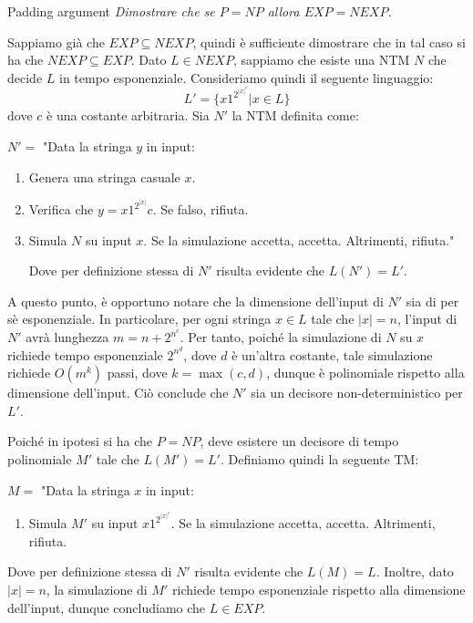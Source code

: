 \begin{Exercise}{Padding argument}{}
\textit{Dimostrare che se $P = NP$ allora $EXP = NEXP$.}

\begin{demonstration}
Sappiamo già che $EXP\subseteq NEXP$, quindi è sufficiente dimostrare che in tal caso si ha che $NEXP\subseteq EXP$. Dato $L\in NEXP$, sappiamo che esiste una NTM $N$ che decide $L$ in tempo esponenziale. Consideriamo quindi il seguente linguaggio:
\begin{equation*}
    L' = \{x1^{2^{|x|^c}}| x\in L\}
\end{equation*}
dove $c$ è una costante arbitraria. Sia $N'$ la NTM definita come:

$N' =$ "Data la stringa $y$ in input:
\begin{enumerate}
    \item Genera una stringa casuale $x$.
    \item Verifica che $y = x1^{2^{|x|}}c$. Se falso, rifiuta.
    \item Simula $N$ su input $x$. Se la simulazione accetta, accetta. Altrimenti, rifiuta."
    
    Dove per definizione stessa di $N'$ risulta evidente che $L(N') = L'$.
\end{enumerate}
A questo punto, è opportuno notare che la dimensione dell’input di $N'$ sia di per sè esponenziale. In particolare, per ogni stringa $x\in L$ tale che $|x| = n$, l’input di $N'$ avrà lunghezza $m = n + 2^{n^c}$. Per tanto, poiché la simulazione di $N$ su $x$ richiede tempo esponenziale $2^{n^d}$, dove $d$ è un’altra costante, tale simulazione richiede $O(m^k)$ passi, dove $k = \max(c, d)$, dunque è polinomiale rispetto alla dimensione dell’input. Ciò conclude che $N'$ sia un decisore non-deterministico per $L'$.

Poiché in ipotesi si ha che $P = NP$, deve esistere un decisore di tempo polinomiale $M'$ tale che $L(M') = L'$. Definiamo quindi la seguente TM:

$M =$ "Data la stringa $x$ in input:
\begin{enumerate}
    \item Simula $M'$ su input $x1^{2^{|x|^c}}$. Se la simulazione accetta, accetta. Altrimenti, rifiuta.
\end{enumerate}
Dove per definizione stessa di $N'$ risulta evidente che $L(M) = L$. Inoltre, dato $|x| = n$, la simulazione di $M'$ richiede tempo esponenziale rispetto alla dimensione dell’input, dunque concludiamo che $L\in EXP$.
\end{demonstration}
\end{Exercise}

